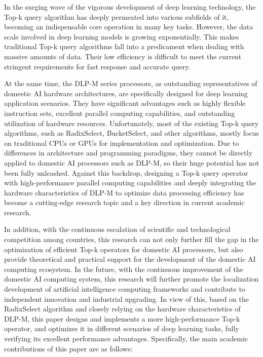 \begin{abstract*}
  In the surging wave of the vigorous development of deep learning technology, the Top-k query algorithm has deeply permeated into various subfields of it, becoming an indispensable core operation in many key tasks.
  However, the data scale involved in deep learning models is growing exponentially. This makes traditional Top-k query algorithms fall into a predicament when dealing with massive amounts of data. Their low efficiency is difficult to meet the current stringent requirements for fast response and accurate query.
  
  At the same time, the DLP-M series processors, as outstanding representatives of domestic AI hardware architectures, are specifically designed for deep learning application scenarios. They have significant advantages such as highly flexible instruction sets, excellent parallel computing capabilities, and outstanding utilization of hardware resources. Unfortunately, most of the existing Top-k query algorithms, such as RadixSelect, BucketSelect, and other algorithms, mostly focus on traditional CPUs or GPUs for implementation and optimization. Due to differences in architecture and programming paradigms, they cannot be directly applied to domestic AI processors such as DLP-M, so their huge potential has not been fully unleashed.
  Against this backdrop, designing a Top-k query operator with high-performance parallel computing capabilities and deeply integrating the hardware characteristics of DLP-M to optimize data processing efficiency has become a cutting-edge research topic and a key direction in current academic research.
  
  In addition, with the continuous escalation of scientific and technological competition among countries, this research can not only further fill the gap in the optimization of efficient Top-k operators for domestic AI processors, but also provide theoretical and practical support for the development of the domestic AI computing ecosystem. In the future, with the continuous improvement of the domestic AI computing system, this research will further promote the localization development of artificial intelligence computing frameworks and contribute to independent innovation and industrial upgrading.
  In view of this, based on the RadixSelect algorithm and closely relying on the hardware characteristics of DLP-M, this paper designs and implements a more high-performance Top-k operator, and optimizes it in different scenarios of deep learning tasks, fully verifying its excellent performance advantages. Specifically, the main academic contributions of this paper are as follows:
  

\end{abstract*}
